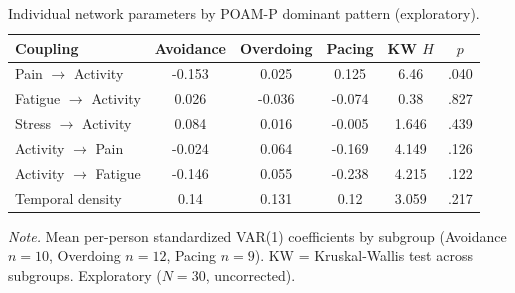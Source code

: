 \begin{table}[H]
\raggedright
\caption{Individual network parameters by POAM-P dominant pattern (exploratory).}
\label{tab:link}
\footnotesize
\begingroup
\setlength{\tabcolsep}{4pt}
\renewcommand{\arraystretch}{1.08}
\noindent
\begin{tabular*}{\textwidth}{@{\extracolsep{\fill}}lccccc@{}}
\toprule
Coupling & Avoidance & Overdoing & Pacing & KW $H$ & $p$ \\
\midrule
Pain $\rightarrow$ Activity & -0.153 & 0.025 & 0.125 & 6.46 & .040 \\
Fatigue $\rightarrow$ Activity & 0.026 & -0.036 & -0.074 & 0.38 & .827 \\
Stress $\rightarrow$ Activity & 0.084 & 0.016 & -0.005 & 1.646 & .439 \\
Activity $\rightarrow$ Pain & -0.024 & 0.064 & -0.169 & 4.149 & .126 \\
Activity $\rightarrow$ Fatigue & -0.146 & 0.055 & -0.238 & 4.215 & .122 \\
Temporal density & 0.14 & 0.131 & 0.12 & 3.059 & .217 \\
\bottomrule
\end{tabular*}
\par\vspace{3pt}\noindent\parbox{\textwidth}{\footnotesize\textit{Note.} Mean per-person standardized VAR(1) coefficients by subgroup (Avoidance $n=10$, Overdoing $n=12$, Pacing $n=9$). KW = Kruskal-Wallis test across subgroups. Exploratory ($N=30$, uncorrected).}
\endgroup
\end{table}
